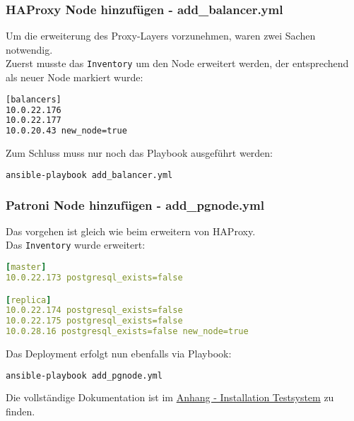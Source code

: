 \begin{flushleft}
    \subsubsection{\Gls{HAProxy} Node hinzufügen - add\_balancer.yml}
    Um die erweiterung des Proxy-Layers vorzunehmen, waren zwei Sachen notwendig.\\
    Zuerst musste das \texttt{Inventory} um den Node erweitert werden, der entsprechend als neuer Node markiert wurde:
    \lstset{style=gra_codestyle}
    \begin{lstlisting}[language=bash, caption=HAProxy Node erweitern - Inventory,captionpos=b,label={lst:add-balancer-inventory},breaklines=true]
[balancers]
10.0.22.176
10.0.22.177
10.0.20.43 new_node=true
    \end{lstlisting}
    Zum Schluss muss nur noch das Playbook ausgeführt werden:
    \lstset{style=gra_codestyle}
    \begin{lstlisting}[language=bash, caption=HAProxy Node erweitern - add\_balancer.yml,captionpos=b,label={lst:add-balancer},breaklines=true]
ansible-playbook add_balancer.yml
    \end{lstlisting}
    \subsubsection{Patroni Node hinzufügen - add\_pgnode.yml}
    Das vorgehen ist gleich wie beim erweitern von \Gls{HAProxy}.\\
    Das \texttt{Inventory} wurde erweitert:
    \lstset{style=gra_codestyle}
    \begin{lstlisting}[language=yaml, caption=Patroni Node erweitern - Inventory,captionpos=b,label={lst:add-pgnode-inventory},breaklines=true]
[master]
10.0.22.173 postgresql_exists=false

[replica]
10.0.22.174 postgresql_exists=false
10.0.22.175 postgresql_exists=false
10.0.28.16 postgresql_exists=false new_node=true
    \end{lstlisting}
    Das Deployment erfolgt nun ebenfalls via Playbook:
    \lstset{style=gra_codestyle}
    \begin{lstlisting}[language=bash, caption=Patroni Node erweitern - add\_pgnode.yml,captionpos=b,label={lst:add-pgnode},breaklines=true]
ansible-playbook add_pgnode.yml
    \end{lstlisting}
\end{flushleft}
\begin{flushleft}
    Die vollständige Dokumentation ist im \hyperref[sec:construction_implementation_installation]{Anhang - Installation Testsystem} zu finden.
\end{flushleft}